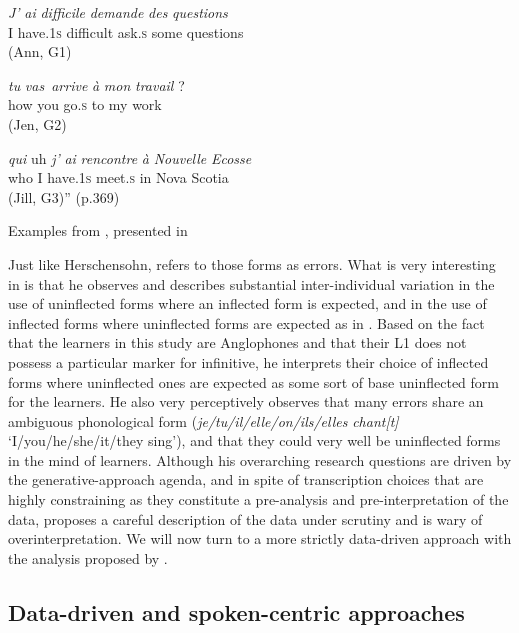 \documentclass[output=paper,colorlinks,citecolor=brown,modfonts,nonflat]{../langscibook}
\begin{document}
\ea%
    \label{ex:leclerq:7}
\ea
\gll \textit{J’} \textit{ai}         {\textit{difficile}} {\textit{demande}} {\textit{des}} {\textit{questions}}\\
         I have.1\textsc{s} difficult ask.\textsc{s} some questions\\
         (Ann, G1)

\ex
{} {\textit{tu}} {\textit{vas}}~{\textit{arrive}} {\textit{à}} {\textit{mon}} {\textit{travail}} ?\\
    how you go.\textsc{s} to my work\\
    (Jen, G2)

\ex
{} {\textit{qui}} {uh} \textit{j’} \textit{ai} {\textit{rencontre}} {\textit{à}} {\textit{Nouvelle}} {\textit{Ecosse}}\\
      {}  who   {} I have.\textsc{1s} meet.\textsc{s} in Nova Scotia\\
        (Jill, G3)” (p.369)
\z
\z

Examples from \citet{Prévost2007English}, presented in \citet[61]{Prévost2007French}

Just like Herschensohn, \citet{Prévost2007English} refers to those forms as errors. What is very interesting in \citet{Prévost2007English} is that he observes and describes substantial inter-individual variation in the use of uninflected forms where an inflected form is expected, and in the use of inflected forms where uninflected forms are expected as in . Based on the fact that the learners in this study are Anglophones and that their L1 does not possess a particular marker for infinitive, he interprets their choice of inflected forms where uninflected ones are expected as some sort of base uninflected form for the learners. He also very perceptively observes that many errors share an ambiguous phonological form (\textit{je/tu/il/elle/on/ils/elles} \textit{chant[t]} ‘I/you/he/she/it/they sing’), and that they could very well be uninflected forms in the mind of learners. Although his overarching research questions are driven by the generative-approach agenda, and in spite of transcription choices that are highly constraining as they constitute a pre-analysis and pre-interpretation of the data, \citet{Prévost2007English} proposes a careful description of the data under scrutiny and is wary of overinterpretation. We will now turn to a more strictly data-driven approach with the analysis proposed by \citet{Granget2015}.

\subsection{ \textbf{Data-driven and spoken-centric approaches}}%
\end{document}
